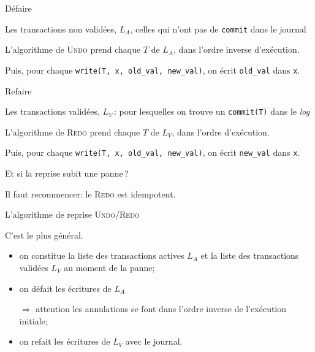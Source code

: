 \begin{frame}{Défaire}

Les transactions non validées, $L_A$,  celles qui n'ont pas
de \texttt{commit} dans le journal

\vfill

L'algorithme de \textsc{Undo} prend chaque $T$ de $L_A$, 
\alert{dans l'ordre inverse d'exécution}.

\vfill

Puis, pour chaque \texttt{write(T, x, old\_val, new\_val)}, on écrit
\texttt{old\_val} dans \texttt{x}.

\end{frame}

\begin{frame}{Refaire}

Les transactions validées, $L_V$\,: 
pour lesquelles on trouve un \texttt{commit(T)} dans le \textit{log}

\vfill

L'algorithme de \textsc{Redo} prend chaque $T$ de $L_V$, 
\alert{dans l'ordre d'exécution}.

\vfill

Puis, pour chaque \texttt{write(T, x, old\_val, new\_val)}, on écrit
\texttt{new\_val} dans \texttt{x}.

\vfill

\begin{block}{}
Et si la reprise subit une panne\,?

\smallskip

 Il faut recommencer:
le \textsc{Redo} est \alert{idempotent}.
\end{block}
\end{frame}





\begin{frame}{L'algorithme de reprise \textsc{Undo/Redo}}

C'est le plus général.

\begin{itemize}
  \item on constitue la liste des transactions actives
       $L_A$ et la liste des transactions validées $L_V$
          au moment de la panne;

  \item on \alert{défait} les écritures de $L_A$ 
  
   $\Rightarrow$ attention
            les annulations se font dans l'ordre inverse de 
                l'exécution initiale;
                
   \item on \alert{refait} les écritures de $L_V$ avec le journal.
\end{itemize}


\end{frame}



